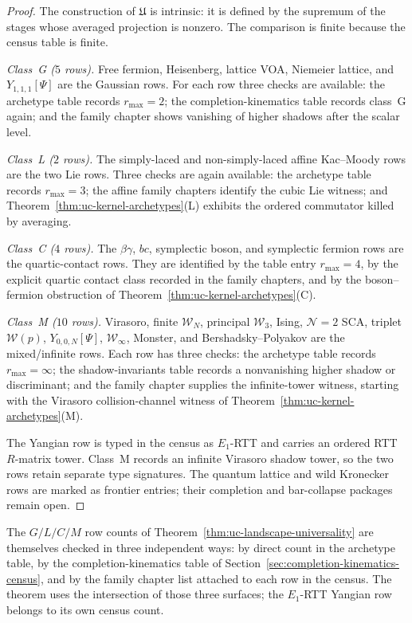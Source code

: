\begin{proof}
The construction of $\mathfrak U$ is intrinsic: it is defined by the
supremum of the stages whose averaged projection is nonzero. The
comparison is finite because the census table is finite.

\emph{Class~G ($5$ rows).} Free fermion, Heisenberg, lattice VOA,
Niemeier lattice, and $Y_{1,1,1}[\Psi]$ are the Gaussian rows. For
each row three checks are available: the archetype table records
$r_{\max}=2$; the completion-kinematics table records class~G again;
and the family chapter shows vanishing of higher shadows after the
scalar level.

\emph{Class~L ($2$ rows).} The simply-laced and non-simply-laced
affine Kac--Moody rows are the two Lie rows. Three checks are again
available: the archetype table records $r_{\max}=3$; the affine family
chapters identify the cubic Lie witness; and
Theorem~\ref{thm:uc-kernel-archetypes}(L) exhibits the ordered
commutator killed by averaging.

\emph{Class~C ($4$ rows).} The $\beta\gamma$, $bc$, symplectic boson,
and symplectic fermion rows are the quartic-contact rows. They are
identified by the table entry $r_{\max}=4$, by the explicit quartic
contact class recorded in the family chapters, and by the
boson--fermion obstruction of
Theorem~\ref{thm:uc-kernel-archetypes}(C).

\emph{Class~M ($10$ rows).} Virasoro, finite $\mathcal W_N$,
principal $\mathcal W_3$, Ising, $\mathcal N{=}2$ SCA, triplet
$\mathcal W(p)$, $Y_{0,0,N}[\Psi]$, $\mathcal W_\infty$, Monster,
and Bershadsky--Polyakov are the mixed/infinite rows. Each row has three
checks: the archetype table records $r_{\max}=\infty$; the
shadow-invariants table records a nonvanishing higher shadow or
discriminant; and the family chapter supplies the infinite-tower
witness, starting with the Virasoro collision-channel witness of
Theorem~\ref{thm:uc-kernel-archetypes}(M).

The Yangian row is typed in the census as $E_1$-RTT and carries an
ordered RTT $R$-matrix tower.  Class~M records an infinite Virasoro
shadow tower, so the two rows retain separate type signatures.  The
quantum lattice and wild Kronecker rows are marked as frontier entries;
their completion and bar-collapse packages remain open.
\end{proof}

\begin{remark}
\label{rem:uc-census-counts}
The $G/L/C/M$ row counts of
Theorem~\ref{thm:uc-landscape-universality} are themselves checked in
three independent ways: by direct count in the archetype table, by the
completion-kinematics table of
Section~\ref{sec:completion-kinematics-census}, and by the family
chapter list attached to each row in the census. The theorem uses the
intersection of those three surfaces; the $E_1$-RTT Yangian row belongs
to its own census count.
\end{remark}

